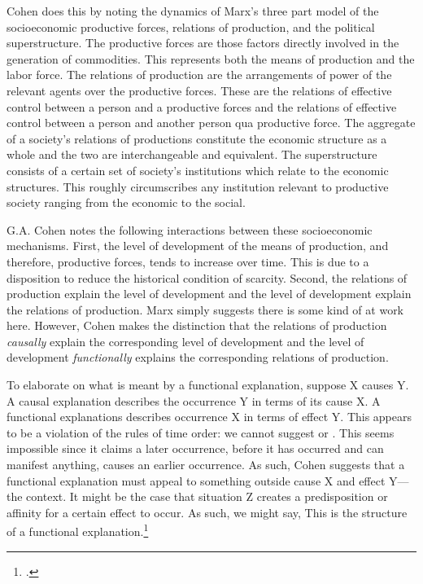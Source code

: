 \documentclass[letterpaper,notitlepage,12pt]{article}
\begin{document}
Cohen does this by noting the dynamics of Marx's three part model of the
socioeconomic productive forces, relations of production, and the political
superstructure.
The productive forces are those factors directly involved in the generation of
commodities.
This represents both the means of production and the labor force.
The relations of production are the arrangements of power of the relevant agents
over the productive forces.
These are the relations of effective control between a person and a productive
forces and the relations of effective control between a person and another
person qua productive force.
The aggregate of a society's relations of productions constitute the economic
structure as a whole and the two are interchangeable and equivalent.
The superstructure consists of a certain set of society's institutions which
relate to the economic structures.
This roughly circumscribes any institution relevant to productive society
ranging from the economic to the social.

G.A. Cohen notes the following interactions between these socioeconomic
mechanisms.
First, the level of development of the means of production, and therefore,
productive forces, tends to increase over time.
This is due to a disposition to reduce the historical condition of scarcity.
Second, the relations of production explain the level of development and the
level of development explain the relations of production.
Marx simply suggests there is some kind of  at work
here.
However, Cohen makes the distinction that the relations of production
\textit{causally} explain the corresponding level of development and the level
of development \textit{functionally} explains the corresponding relations of
production.

To elaborate on what is meant by a functional explanation, suppose X causes Y.
A causal explanation describes the occurrence Y in terms of its cause X.
A functional explanations describes occurrence X in terms of effect Y.
This appears to be a violation of the rules of time order: we cannot suggest
 or . 
This seems impossible since it claims a later occurrence, before it has occurred
and can manifest anything, causes an earlier occurrence.
As such, Cohen suggests that a functional explanation must appeal to something
outside cause X and effect Y---the context.
It might be the case that situation Z creates a predisposition or affinity for a
certain effect to occur.
As such, we might say, 
This is the structure of a functional explanation.\footcite{cohen_karl_2001}
\end{document}

